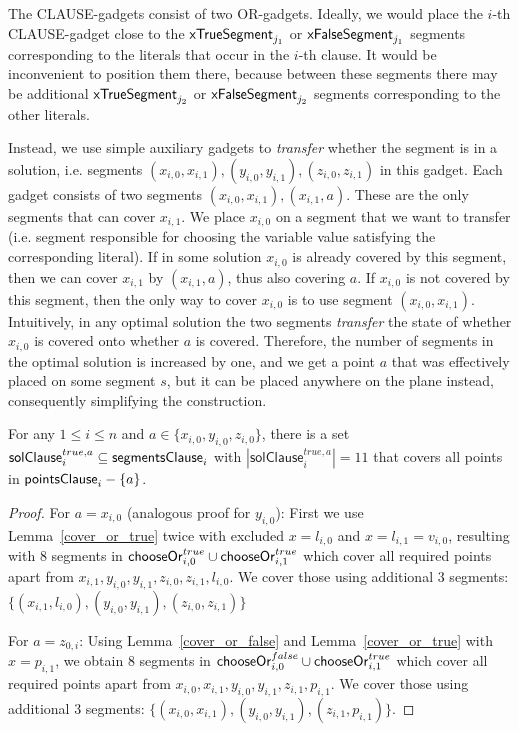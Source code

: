 \newcommand{\segmentsClauseSolTrue}[1]{\mathsf{solClause}^{true,#1}}
\newcommand{\segmentsClauseSolFalse}{\mathsf{solClause}^{false}}

The CLAUSE-gadgets consist of two OR-gadgets.
Ideally, we would place the $i$-th CLAUSE-gadget close to the
$\mathsf{xTrueSegment}_{j_1}$ or $\mathsf{xFalseSegment}_{j_1}$ segments
corresponding to the literals that occur in the $i$-th clause.
It would be inconvenient to position them there,
because between these segments there may be additional
$\mathsf{xTrueSegment}_{j_2}$ or $\mathsf{xFalseSegment}_{j_2}$
segments corresponding to the other literals.

Instead, we use simple auxiliary gadgets to
\textit{transfer} whether the segment
is in a solution, i.e. segments
$(x_{i, 0}, x_{i, 1}), (y_{i, 0}, y_{i, 1}), (z_{i, 0}, z_{i, 1})$ in this gadget.
Each gadget consists of two segments $(x_{i, 0}, x_{i, 1}), (x_{i, 1}, a)$.
These are the only segments that can cover $x_{i,1}$.
We place $x_{i,0}$ on a segment that we want to transfer (i.e.
segment responsible for choosing the variable value satisfying the
corresponding literal).
If in some solution $x_{i,0}$ is already covered by this segment, then
we can cover $x_{i,1}$ by $(x_{i,1}, a)$, thus also covering $a$.
If $x_{i,0}$ is not covered by this segment,
then the only way to cover $x_{i,0}$ is to use segment $(x_{i, 0}, x_{i, 1})$.
Intuitively,
in any optimal solution the two segments \textit{transfer} the state of whether $x_{i,0}$
is covered onto whether $a$ is covered.
Therefore, the number of segments in the optimal solution is increased by one,
and we get a point $a$ that was effectively placed
on some segment $s$, but it can be placed anywhere on the plane instead,
consequently simplifying the construction.

\begin{lemma}
\label{cover_clauses_solution_true}
For any $1 \le i \le n$ and $a \in \{ x_{i, 0}, y_{i, 0}, z_{i, 0}\}$,
there is a set $\segmentsClauseSolTrue{a}_i \subseteq \segmentsClause_i$
with $|\segmentsClauseSolTrue{a}_i| = 11$
that covers all points in $\mathsf{pointsClause}_{i} - \{a\}$.
\end{lemma}

\begin{proof}
For $a = x_{i, 0}$ (analogous proof for $y_{i, 0}$):
First we use Lemma~\ref{cover_or_true} twice with excluded $x = l_{i, 0}$ and
$x = l_{i, 1} = v_{i, 0}$,
resulting with 8 segments in $\mathsf{chooseOr}^{true}_{i,0} \cup \mathsf{chooseOr}^{true}_{i,1}$
which cover all required points apart from
$x_{i, 1}, y_{i, 0}, y_{i, 1}, z_{i, 0}, z_{i, 1}, l_{i, 0}$.
We cover those using additional 3 segments:
$\{ (x_{i, 1}, l_{i, 0}), (y_{i, 0}, y_{i, 1}),
(z_{i, 0}, z_{i, 1}) \}$

For $a = z_{0, i}$:
Using Lemma~\ref{cover_or_false} and Lemma~\ref{cover_or_true} with
$x = p_{i, 1}$,
we obtain 8 segments in $\mathsf{chooseOr}^{false}_{i,0} \cup \mathsf{chooseOr}^{true}_{i,1}$
which cover all required points apart from
$x_{i, 0}, x_{i, 1}, y_{i, 0}, y_{i, 1}, z_{i, 1}, p_{i, 1}$.
We cover those using additional 3 segments:
$\{ (x_{i, 0}, x_{i, 1}), (y_{i, 0}, y_{i, 1}),
(z_{i, 1}, p_{i, 1}) \}$.
\end{proof}

